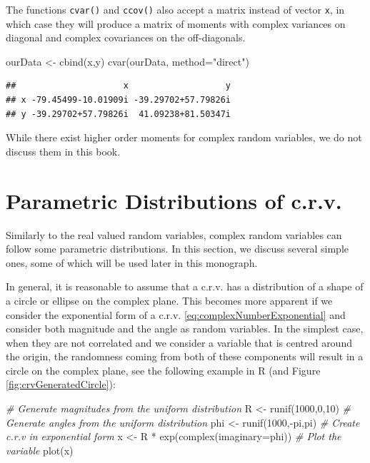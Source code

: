 \documentclass[
]{book}
\newenvironment{Shaded}{\begin{snugshade}}{\end{snugshade}}
\newcommand{\AttributeTok}[1]{\textcolor[rgb]{0.77,0.63,0.00}{#1}}
\newcommand{\CommentTok}[1]{\textcolor[rgb]{0.56,0.35,0.01}{\textit{#1}}}
\newcommand{\DecValTok}[1]{\textcolor[rgb]{0.00,0.00,0.81}{#1}}
\newcommand{\FunctionTok}[1]{\textcolor[rgb]{0.00,0.00,0.00}{#1}}
\newcommand{\NormalTok}[1]{#1}
\newcommand{\OtherTok}[1]{\textcolor[rgb]{0.56,0.35,0.01}{#1}}
\newcommand{\SpecialCharTok}[1]{\textcolor[rgb]{0.00,0.00,0.00}{#1}}
\newcommand{\StringTok}[1]{\textcolor[rgb]{0.31,0.60,0.02}{#1}}
\begin{document}
The functions \texttt{cvar()} and \texttt{ccov()} also accept a matrix instead of vector \texttt{x}, in which case they will produce a matrix of moments with complex variances on diagonal and complex covariances on the off-diagonals.

\begin{Shaded}
\begin{Highlighting}[]
\NormalTok{ourData }\OtherTok{\textless{}{-}} \FunctionTok{cbind}\NormalTok{(x,y)}
\FunctionTok{cvar}\NormalTok{(ourData, }\AttributeTok{method=}\StringTok{"direct"}\NormalTok{)}
\end{Highlighting}
\end{Shaded}

\begin{verbatim}
##                     x                   y
## x -79.45499-10.01909i -39.29702+57.79826i
## y -39.29702+57.79826i  41.09238+81.50347i
\end{verbatim}

While there exist higher order moments for complex random variables, we do not discuss them in this book.

\hypertarget{parametric-distributions-of-c.r.v.}{%
\section{Parametric Distributions of c.r.v.}\label{parametric-distributions-of-c.r.v.}}

Similarly to the real valued random variables, complex random variables can follow some parametric distributions. In this section, we discuss several simple ones, some of which will be used later in this monograph.

In general, it is reasonable to assume that a c.r.v. has a distribution of a shape of a circle or ellipse on the complex plane. This becomes more apparent if we consider the exponential form of a c.r.v. \eqref{eq:complexNumberExponential} and consider both magnitude and the angle as random variables. In the simplest case, when they are not correlated and we consider a variable that is centred around the origin, the randomness coming from both of these components will result in a circle on the complex plane, see the following example in R (and Figure \ref{fig:crvGeneratedCircle}):

\begin{Shaded}
\begin{Highlighting}[]
\CommentTok{\# Generate magnitudes from the uniform distribution}
\NormalTok{R }\OtherTok{\textless{}{-}} \FunctionTok{runif}\NormalTok{(}\DecValTok{1000}\NormalTok{,}\DecValTok{0}\NormalTok{,}\DecValTok{10}\NormalTok{)}
\CommentTok{\# Generate angles from the uniform distribution}
\NormalTok{phi }\OtherTok{\textless{}{-}} \FunctionTok{runif}\NormalTok{(}\DecValTok{1000}\NormalTok{,}\SpecialCharTok{{-}}\NormalTok{pi,pi)}
\CommentTok{\# Create c.r.v in exponential form}
\NormalTok{x }\OtherTok{\textless{}{-}}\NormalTok{ R }\SpecialCharTok{*} \FunctionTok{exp}\NormalTok{(}\FunctionTok{complex}\NormalTok{(}\AttributeTok{imaginary=}\NormalTok{phi))}
\CommentTok{\# Plot the variable}
\FunctionTok{plot}\NormalTok{(x)}
\end{Highlighting}
\end{Shaded}
\end{document}
